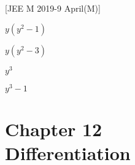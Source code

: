 \documentclass[journal,,12pt,twocolumn]{IEEEtran}
\theoremstyle{remark}
\begin{document}
\begin{enumerate}
\hfill{[JEE M 2019-9 April(M)]} 
\begin{enumerate}
\begin{multicols}{2}
    \item $y(y^2-1)$
    \columnbreak
    \item $y(y^2-3)$
    \end{multicols}
    \begin{multicols}{2}
    \item $y^3$
    \item $y^3-1$
    \end{multicols}
\end{enumerate}

\end{enumerate}
    
    
    
    
    \section*{Chapter 12 \\ Differentiation}
\end{document}
